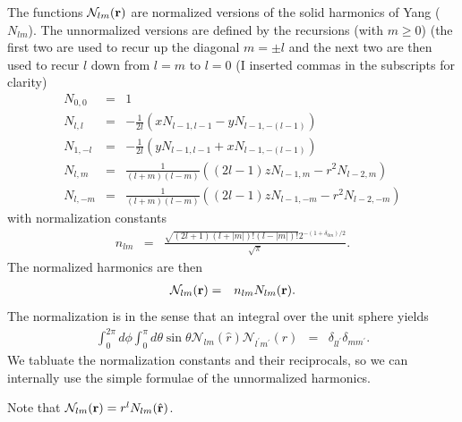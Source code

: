 \documentclass[12pt]{article}
\newcommand{\N}{\mathcal{N}}
\newcommand{\rv}{\vb{r}}
\newcommand{\rhat}{\hat{\rv}}
\begin{document}
The functions $\N_{lm}(\vb{r})$ are normalized versions of the solid harmonics of Yang ($N_{lm}$).  The unnormalized versions are defined by the recursions (with $m\ge 0$) (the first two are used to recur up the diagonal $m=\pm l$ and the next two are then used to recur $l$ down from $l=m$ to $l=0$ (I inserted commas in the subscripts for clarity)
\begin{eqnarray}
  N_{0,0} & = & 1 \\
  N_{l, l} & = & -\frac{1}{2 l} \left(x N_{l-1,l-1} - y N_{l - 1, -(l - 1)}\right) \\
  N_{1,-l} & = & -\frac{1}{2 l} \left(y N_{l-1,l-1} + x N_{l - 1, -(l - 1)}\right) \\ 
  N_{l, m} & = & \frac{1}{(l+m) (l-m)} \left((2 l-1) z N_{l-1, m}-r^2  N_{l-2, m} \right) \\
  N_{l, -m}& = & \frac{1}{(l+m) (l-m)} \left((2 l-1) z N_{l-1, -m}-r^2 N_{l-2, -m} \right) 
\end{eqnarray}
with normalization constants
\begin{eqnarray}
  n_{lm} & = & \frac{\sqrt{(2 l +1) \left(l +{| m |}\right)! \left(l -{| m |}\right)!}  2^{-(1 + \delta_{0 m})/2}}{\sqrt{\pi}} .
\end{eqnarray}
The normalized harmonics are then
\begin{eqnarray}
  \N_{lm}(\vb{r}) & = & n_{lm} N_{lm}(\vb{r}).
\end{eqnarray}
The normalization is in the sense that an integral over the unit sphere yields
\begin{eqnarray}
  \int_0^{2 \pi} d\phi \int_0^\pi d\theta \sin \theta  \N_{lm} (\hat{r}) \N_{l^\prime m^\prime}(\hat{r})  & = & \delta_{l l^\prime} \delta_{m m^\prime} .
\end{eqnarray}
We tabluate the normalization constants and their reciprocals, so we can internally use the simple formulae of the unnormalized harmonics.

Note that $\N_{lm}(\vb{r}) = r^l N_{lm}(\rhat)$.
\end{document}
